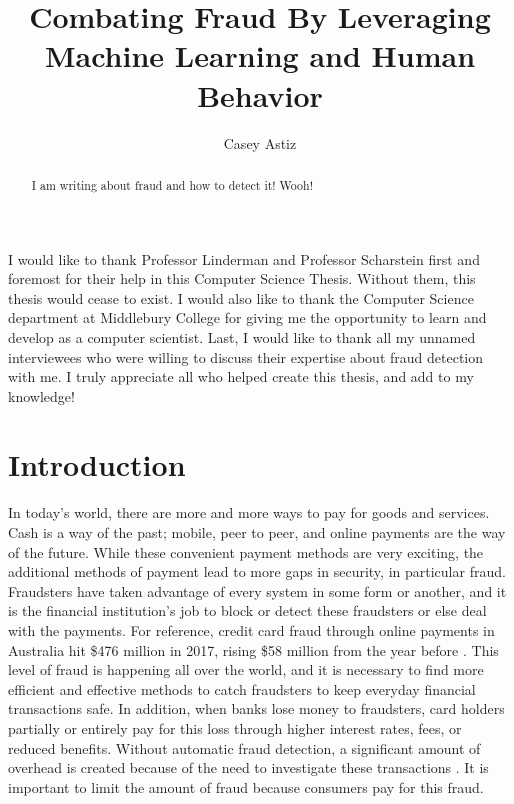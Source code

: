\documentclass[midd]{thesis}
\title {Combating Fraud By Leveraging Machine Learning and Human Behavior}
\author {Casey Astiz}
\begin{document}
\maketitle
{}

\begin{abstract}
I am writing about fraud and how to detect it! Wooh!
\end{abstract}

\begin{acknowledgements}
I would like to thank Professor Linderman and Professor Scharstein first and foremost for their help in this Computer Science Thesis. Without them, this thesis would cease to exist. I would also like to thank the Computer Science department at Middlebury College for giving me the opportunity to learn and develop as a computer scientist. Last, I would like to thank all my unnamed interviewees who were willing to discuss their expertise about fraud detection with me. I truly appreciate all who helped create this thesis, and add to my knowledge!

\end{acknowledgements}

\contentspage
\tablelistpage   %
\figurelistpage

\normalspacing \setcounter{page}{1} 

\chapter{Introduction}
\label{sec:intro}

In today's world, there are more and more ways to pay for goods and services. Cash is a way of the past; mobile, peer to peer, and online payments are the way of the future. While these convenient payment methods are very exciting, the additional methods of payment lead to more gaps in security, in particular fraud. Fraudsters have taken advantage of every system in some form or another, and it is the financial institution's job to block or detect these fraudsters or else deal with the payments. For reference, credit card fraud through online payments in Australia hit \$476 million in 2017, rising \$58 million from the year before \cite{Wang2018}. This level of fraud is happening all over the world, and it is necessary to find more efficient and effective methods to catch fraudsters to keep everyday financial transactions safe. In addition, when banks lose money to fraudsters, card holders partially or entirely pay for this loss through higher interest rates, fees, or reduced benefits. Without automatic fraud detection, a significant amount of overhead is created because of the need to investigate these transactions \cite{Chan}. It is important to limit the amount of fraud because consumers pay for this fraud. 
\end{document}
